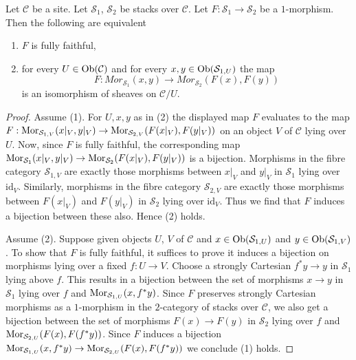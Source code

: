 \begin{lemma}
\label{lemma-characterize-ff}
Let $\mathcal{C}$ be a site.
Let $\mathcal{S}_1$, $\mathcal{S}_2$ be stacks over $\mathcal{C}$.
Let $F : \mathcal{S}_1 \to \mathcal{S}_2$ be a $1$-morphism.
Then the following are equivalent
\begin{enumerate}
\item $F$ is fully faithful,
\item for every $U \in \mathop{\mathrm{Ob}}\nolimits(\mathcal{C})$ and for every
$x, y \in \mathop{\mathrm{Ob}}\nolimits(\mathcal{S}_{1, U})$ the map
$$
F :
\mathit{Mor}_{\mathcal{S}_1}(x, y)
\longrightarrow
\mathit{Mor}_{\mathcal{S}_2}(F(x), F(y))
$$
is an isomorphism of sheaves on $\mathcal{C}/U$.
\end{enumerate}
\end{lemma}

\begin{proof}
Assume (1). For $U, x, y$ as in (2) the displayed map $F$ evaluates to the map
$F : \mathop{\mathrm{Mor}}\nolimits_{\mathcal{S}_{1, V}}(x|_V, y|_V) \to
\mathop{\mathrm{Mor}}\nolimits_{\mathcal{S}_{2, V}}(F(x|_V), F(y|_V))$
on an object $V$ of $\mathcal{C}$ lying over $U$.
Now, since $F$ is fully faithful, the corresponding map
$\mathop{\mathrm{Mor}}\nolimits_{\mathcal{S}_1}(x|_V, y|_V) \to \mathop{\mathrm{Mor}}\nolimits_{\mathcal{S}_2}(F(x|_V), F(y|_V))$
is a bijection. Morphisms in the fibre category $\mathcal{S}_{1, V}$ are
exactly those morphisms between $x|_V$ and $y|_V$ in $\mathcal{S}_1$ lying
over $\text{id}_V$. Similarly, morphisms in the fibre category
$\mathcal{S}_{2, V}$ are exactly those morphisms between $F(x|_V)$ and
$F(y|_V)$ in $\mathcal{S}_2$ lying over $\text{id}_V$. Thus we find that $F$
induces a bijection between these also. Hence (2) holds.

\medskip\noindent
Assume (2). Suppose given objects $U$, $V$ of $\mathcal{C}$ and
$x \in \mathop{\mathrm{Ob}}\nolimits(\mathcal{S}_{1, U})$ and
$y \in \mathop{\mathrm{Ob}}\nolimits(\mathcal{S}_{1, V})$. To show that $F$ is fully faithful,
it suffices to prove it induces a bijection on
morphisms lying over a fixed $f : U \to V$. Choose a strongly Cartesian
$f^*y \to y$ in $\mathcal{S}_1$ lying above $f$. This results in a
bijection between the set of morphisms $x \to y$ in $\mathcal{S}_1$ lying
over $f$ and $\mathop{\mathrm{Mor}}\nolimits_{\mathcal{S}_{1, U}}(x, f^*y)$. Since $F$ preserves
strongly Cartesian morphisms as a $1$-morphism in the $2$-category
of stacks over $\mathcal{C}$, we also get a bijection
between the set of morphisms $F(x) \to F(y)$ in $\mathcal{S}_2$ lying
over $f$ and $\mathop{\mathrm{Mor}}\nolimits_{\mathcal{S}_{2, U}}(F(x), F(f^*y))$.
Since $F$ induces a bijection
$\mathop{\mathrm{Mor}}\nolimits_{\mathcal{S}_{1, U}}(x, f^*y) \to
\mathop{\mathrm{Mor}}\nolimits_{\mathcal{S}_{2, U}}(F(x), F(f^*y))$
we conclude (1) holds.
\end{proof}

